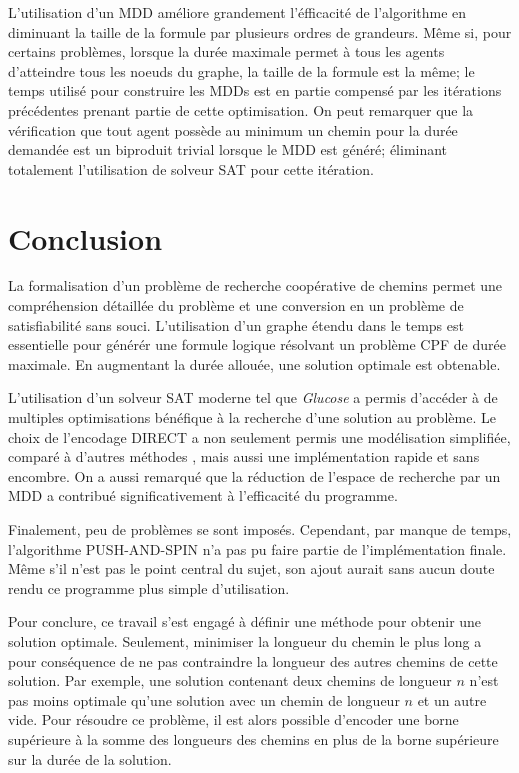 \documentclass[french, 12pt, letterpaper]{article}
\theoremstyle{definition}
\theoremstyle{proposition}
\theoremstyle{example}
\begin{document}
    L'utilisation d'un MDD améliore grandement l'éfficacité de l'algorithme en diminuant la taille de la formule par plusieurs
    ordres de grandeurs. Même si, pour certains problèmes, lorsque la durée maximale permet à tous les agents d'atteindre tous les noeuds
    du graphe, la taille de la formule est la même; le temps utilisé pour construire les MDDs est en partie compensé par les itérations précédentes
    prenant partie de cette optimisation. On peut remarquer que la vérification que tout agent possède au minimum un chemin pour 
    la durée demandée est un biproduit trivial lorsque le MDD est généré; éliminant totalement l'utilisation de solveur SAT pour cette itération. 

    \newpage
    \section*{Conclusion}

    La formalisation d'un problème de recherche coopérative de chemins permet une compréhension détaillée du problème
    et une conversion en un problème de satisfiabilité sans souci. L'utilisation d'un graphe étendu dans
    le temps est essentielle pour générér une formule logique résolvant un problème CPF de durée maximale. 
    En augmentant la durée allouée, une solution optimale est obtenable.

    L'utilisation d'un solveur SAT moderne tel que \emph{Glucose} a permis d'accéder à de multiples optimisations bénéfique
    à la recherche d'une solution au problème. Le choix de l'encodage DIRECT a non seulement permis une modélisation simplifiée, comparé à d'autres
    méthodes \cite{PSUR16}, mais aussi une implémentation rapide et sans encombre. On a aussi remarqué que la réduction de l'espace
    de recherche par un MDD a contribué significativement à l'efficacité du programme.

    Finalement, peu de problèmes se sont imposés. Cependant, par manque de temps, l'algorithme PUSH-AND-SPIN n'a pas pu faire partie de
    l'implémentation finale. Même s'il n'est pas le point central du sujet, son ajout aurait sans aucun doute rendu ce programme
    plus simple d'utilisation.

    Pour conclure, ce travail s'est engagé à définir une méthode pour obtenir une solution optimale. 
    Seulement, minimiser la longueur du chemin le plus long a pour conséquence de ne pas contraindre la longueur des autres chemins
    de cette solution. Par exemple, une solution contenant deux chemins de longueur $n$ n'est pas moins optimale qu'une solution 
    avec un chemin de longueur $n$ et un autre vide. Pour résoudre ce problème, il est alors possible d'encoder une borne supérieure
    à la somme des longueurs des chemins \cite{PSURTEG} en plus de la borne supérieure sur la durée de la solution.
\end{document}
